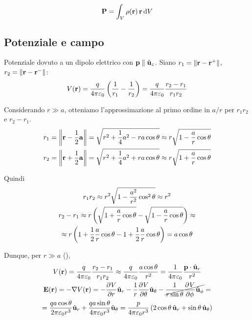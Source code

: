 \begin{equation}
    \mathbf{P} = \int_V \rho(\mathbf{r}) \, \mathbf{r} \, \mathrm{d} V
\end{equation}


\subsection{Potenziale e campo}

Potenziale dovuto a un dipolo elettrico con $\mathbf{p} \parallel \hat{\mathbf{u}}_{z}$.
Siano $r_1 = \left\lVert \mathbf{r} - \mathbf{r}^+ \right\rVert$, $r_2 = \left\lVert \mathbf{r} - \mathbf{r}^- \right\rVert$:
\begin{equation}
    V(\mathbf{r}) = \frac{q}{4\pi\varepsilon_0} \left( \frac{1}{r_1} - \frac{1}{r_2} \right)
    = \frac{q}{4\pi\varepsilon_0} \frac{r_2 - r_1}{r_1 r_2}
\end{equation}


Considerando $r \gg a$, otteniamo l'approssimazione al primo ordine in $a/r$ per $r_1 r_2$ e $r_2 - r_1$.
\begin{subequations}
\begin{gather}
    r_1 = \left\lVert \mathbf{r} - \frac{1}{2}\mathbf{a} \right\rVert = \sqrt{r^2 + \frac{1}{4} a^2 - r a \cos \theta} \approx r \sqrt{1 - \frac{a}{r}\cos\theta} \\
    r_2 = \left\lVert \mathbf{r} + \frac{1}{2}\mathbf{a} \right\rVert = \sqrt{r^2 + \frac{1}{4} a^2 + r a \cos \theta} \approx r \sqrt{1 + \frac{a}{r}\cos\theta}
\end{gather}
\end{subequations}

Quindi
\begin{subequations}
\begin{gather}
    r_1 r_2 \approx r^2 \sqrt{1 - \frac{a^2}{r^2}\cos^2 \theta} \approx r^2 \\
\begin{gathered}
    r_2 - r_1 \approx r \left( \sqrt{1 + \frac{a}{r}\cos\theta} - \sqrt{1 - \frac{a}{r}\cos\theta} \right) \approx \\
    \approx r \left( 1 + \frac{1}{2} \frac{a}{r} \cos \theta - 1 + \frac{1}{2} \frac{a}{r} \cos \theta \right)
    = a \cos \theta
\end{gathered}
\end{gather}
\end{subequations}

Dunque, per $r \gg a$ (),
\begin{gather}
    \spot(\p) = \frac{q}{4\pi \eps_0} \frac{r_2 - r_1}{r_1 r_2}
    \approx \frac{q}{4\pi \eps_0} \frac{a \cos \theta}{r^2}
    = \frac{1}{4\pi \eps_0} \frac{\vt{p} \cdot \ver{r}}{r^2} \\
\begin{gathered}
\label{eq:campo_dipolo_elettrico}
    \E(\p) = - \grad \spot(\p)
    = -\parder[\spot]{r} \ver{r} - \frac{1}{r}\parder[\spot]{\theta} \ver{\theta} - \cancel{\frac{1}{r \sin \theta} \parder[\spot]{\phi} \ver{\phi}} = \\
    = \frac{q a \cos\theta}{2\pi \eps_0 r^3} \ver{r} + \frac{q a \sin\theta}{4\pi \eps_0 r^3} \ver{\theta}
    = \frac{p}{4\pi \eps_0 r^3} \pts{2 \cos\theta \, \ver{r} + \sin\theta \, \ver{\theta}}
\end{gathered}
\end{gather}

